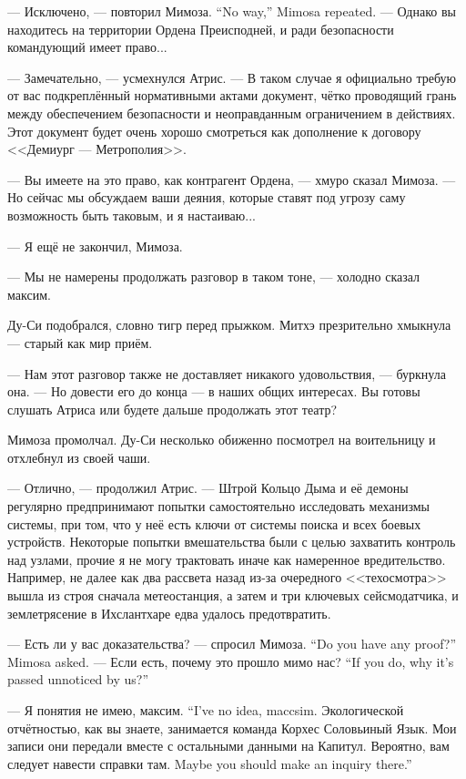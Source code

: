 {--- Исключено, --- повторил Мимоза.}
{``No way,'' Mimosa repeated.}
--- Однако вы находитесь на территории Ордена Преисподней, и ради безопасности командующий имеет право...

--- Замечательно, --- усмехнулся Атрис.
--- В таком случае я официально требую от вас подкреплённый нормативными актами документ, чётко проводящий грань между обеспечением безопасности и неоправданным ограничением в действиях.
Этот документ будет очень хорошо смотреться как дополнение к договору <<Демиург --- Метрополия>>.

--- Вы имеете на это право, как контрагент Ордена, --- хмуро сказал Мимоза.
--- Но сейчас мы обсуждаем ваши деяния, которые ставят под угрозу саму возможность быть таковым, и я настаиваю...

--- Я ещё не закончил, Мимоза.

--- Мы не намерены продолжать разговор в таком тоне, --- холодно сказал максим.

Ду-Си подобрался, словно тигр перед прыжком.
Митхэ презрительно хмыкнула --- старый как мир приём.

--- Нам этот разговор также не доставляет никакого удовольствия, --- буркнула она.
--- Но довести его до конца --- в наших общих интересах.
Вы готовы слушать Атриса или будете дальше продолжать этот театр?

Мимоза промолчал.
Ду-Си несколько обиженно посмотрел на воительницу и отхлебнул из своей чаши.

--- Отлично, --- продолжил Атрис.
--- Штрой Кольцо Дыма и её демоны регулярно предпринимают попытки самостоятельно исследовать механизмы системы, при том, что у неё есть ключи от системы поиска и всех боевых устройств.
Некоторые попытки вмешательства были с целью захватить контроль над узлами, прочие я не могу трактовать иначе как намеренное вредительство.
Например, не далее как два рассвета назад из-за очередного <<техосмотра>> вышла из строя сначала метеостанция, а затем и три ключевых сейсмодатчика, и землетрясение в Ихслантхаре едва удалось предотвратить.

{--- Есть ли у вас доказательства? --- спросил Мимоза.}
{``Do you have any proof?'' Mimosa asked.}
{--- Если есть, почему это прошло мимо нас?}
{``If you do, why it's passed unnoticed by us?''}

{--- Я понятия не имею, максим.}
{``I've no idea, maccsim.}
Экологической отчётностью, как вы знаете, занимается команда Корхес Соловьиный Язык.
Мои записи они передали вместе с остальными данными на Капитул.
{Вероятно, вам следует навести справки там.}
{Maybe you should make an inquiry there.''}

